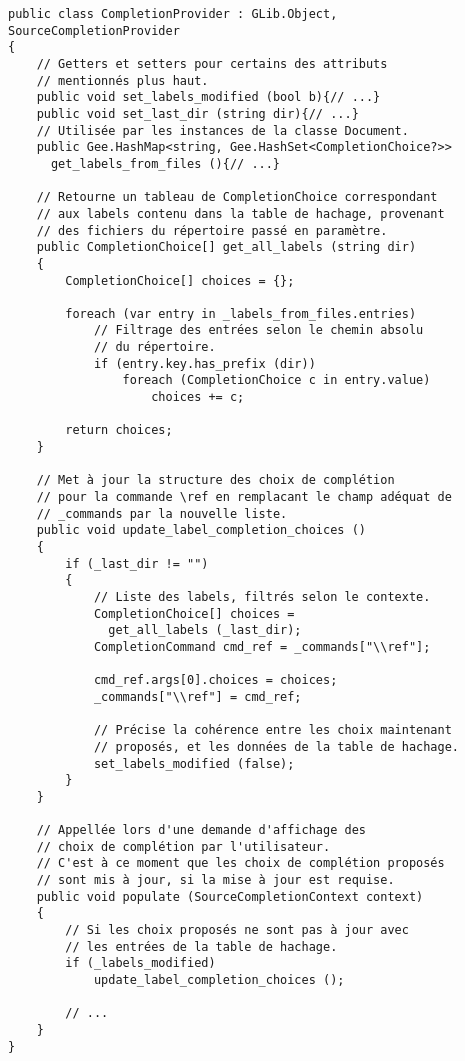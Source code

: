 \documentclass[a4paper,11pt]{report}
\begin{document}
\begin{lstlisting}[frame=single]
public class CompletionProvider : GLib.Object, SourceCompletionProvider
{
    // Getters et setters pour certains des attributs
    // mentionnés plus haut.
    public void set_labels_modified (bool b){// ...}
    public void set_last_dir (string dir){// ...}
    // Utilisée par les instances de la classe Document.
    public Gee.HashMap<string, Gee.HashSet<CompletionChoice?>> 
      get_labels_from_files (){// ...}
    
    // Retourne un tableau de CompletionChoice correspondant
    // aux labels contenu dans la table de hachage, provenant
    // des fichiers du répertoire passé en paramètre.
    public CompletionChoice[] get_all_labels (string dir)
    {
        CompletionChoice[] choices = {};
        
        foreach (var entry in _labels_from_files.entries)
            // Filtrage des entrées selon le chemin absolu
            // du répertoire.
            if (entry.key.has_prefix (dir))
                foreach (CompletionChoice c in entry.value)
                    choices += c;
        
        return choices;
    }
    
    // Met à jour la structure des choix de complétion
    // pour la commande \ref en remplacant le champ adéquat de
    // _commands par la nouvelle liste.
    public void update_label_completion_choices ()
    {
        if (_last_dir != "")
        {
            // Liste des labels, filtrés selon le contexte.
            CompletionChoice[] choices =
              get_all_labels (_last_dir);
            CompletionCommand cmd_ref = _commands["\\ref"];

            cmd_ref.args[0].choices = choices;
            _commands["\\ref"] = cmd_ref;

            // Précise la cohérence entre les choix maintenant
            // proposés, et les données de la table de hachage.
            set_labels_modified (false);
        }
    }
    
    // Appellée lors d'une demande d'affichage des
    // choix de complétion par l'utilisateur.
    // C'est à ce moment que les choix de complétion proposés
    // sont mis à jour, si la mise à jour est requise.
    public void populate (SourceCompletionContext context)
    {
        // Si les choix proposés ne sont pas à jour avec
        // les entrées de la table de hachage.
        if (_labels_modified)
            update_label_completion_choices ();
        
        // ...
    }
}
\end{lstlisting}
\end{document}
